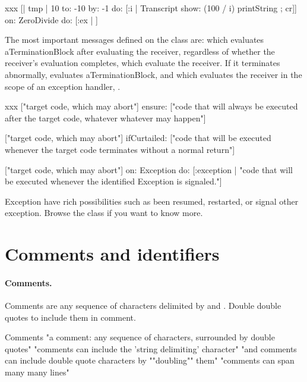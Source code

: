 \documentclass[a4paper,10pt,twoside]{book}
\begin{document}
\begin{script}[xxx]{xxx}
[| tmp | 
10 to: -10 by: -1 do: [:i | Transcript show: (100 / i) printString ; cr]] 
   on: ZeroDivide
   do: [:ex |  ]
\end{script}

The most important messages defined on the class  are: 
 which evaluates aTerminationBlock after evaluating the receiver, regardless of whether the receiver's evaluation completes,  which evaluate the receiver. If it terminates abnormally, evaluates aTerminationBlock, and  which evaluates the receiver in the scope of an exception handler, .

\begin{script}[xxx]{xxx}
["target code, which may abort"] 
   ensure: 
      ["code that will always be executed after the target code,
      whatever whatever may happen"] 

["target code, which may abort"]
   ifCurtailed: 
      ["code that will be executed whenever the
      target code terminates without a normal return"]

["target code, which may abort"] 
   on: Exception
   do: 
      [:exception |
      "code that will be executed whenever the identified Exception
      is signaled."]
\end{script}

Exception have rich possibilities such as been resumed, restarted, or 
signal other exception. Browse the class  if you want 
to know more.




\section{Comments and identifiers}
\paragraph{Comments.}


Comments are any sequence of characters delimited by  and . Double double quotes to include them in comment. 


\begin{script}{Comments}
"a comment:  any sequence of characters, surrounded by double quotes"
"comments can include the 'string delimiting' character"
"and comments can include double quote characters by ""doubling"" them"
"comments can span many
many
lines"
\end{script}
\end{document}

